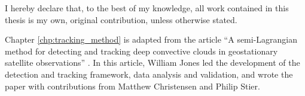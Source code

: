 \begin{originality}
I hereby declare that, to the best of my knowledge, all work contained in this thesis is my own, original contribution, unless otherwise stated.

Chapter \ref{chp:tracking_method} is adapted from the article ``A semi-Lagrangian method for detecting and tracking deep convective clouds in geostationary satellite observations'' \citep{jones_semi-lagrangian_2023}. In this article, William Jones led the development of the detection and tracking framework, data analysis and validation, and wrote the paper with contributions from Matthew Christensen and Philip Stier.


\end{originality}
